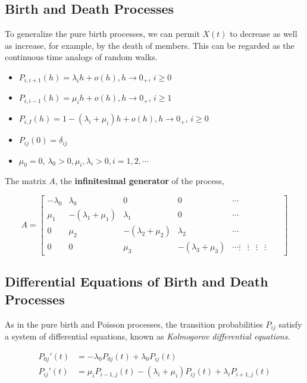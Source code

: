 \documentclass[12pt]{article}
\theoremstyle{nonumberbreak}
\begin{document}
\subsection{Birth and Death Processes}

To generalize the pure birth processes, we can permit $X(t)$ to decrease as well as increase, for example, by the death of members. This can be regarded as the continuous time analogs of random walks. 


\begin{itemize}
	\item $P_{i, i+1}(h) = \lambda_i h + o(h), h \to 0_+$, $i \ge 0$
	\item $P_{i, i-1}(h) = \mu_i h + o(h), h \to 0_+$, $i \ge 1$
	\item $P_{i,I} (h) = 1 -(\lambda_i + \mu_i) h + o(h), h \to 0_+$, $i \ge 0$
	\item $P_{ij} (0) = \delta_{ij}$
	\item $\mu_0 = 0$, $\lambda_0 > 0, \mu_i, \lambda_i > 0, i=1,2,\cdots$
\end{itemize}

The matrix $A$, the \textbf{infinitesimal generator} of the process,

$$
A = \begin{bmatrix}
-\lambda_0 & \lambda_0 & 0 & 0 & \cdots \\
\mu_1 & -(\lambda_1 + \mu_1)  & \lambda_1 & 0 & \cdots \\
0 & \mu_2 & -(\lambda_2 + \mu_2) & \lambda_2 & \cdots \\
0 & 0 & \mu_3 & -(\lambda_3 + \mu_3) & \cdots
\vdots & \vdots &  \vdots &  \vdots &   & 
\end{bmatrix}
$$


\subsection{Differential Equations of Birth and Death Processes}

As in the pure birth and Poisson processes, the transition probabilities $P_{ij}$ satisfy a system of differential equations, known as \textit{Kolmogorov differential equations}. 

$$
\begin{aligned}
P_{0j}'(t) &= -\lambda_0 P_{0j} (t) + \lambda_0 P_{ij}(t) \\[8pt]
P_{ij}'(t) &= \mu_i P_{i-1, j} (t) - (\lambda_i + \mu_i) P_{ij}(t) + \lambda_i P_{i+1, j}(t) \\[8pt]
\end{aligned}
$$
\end{document}
